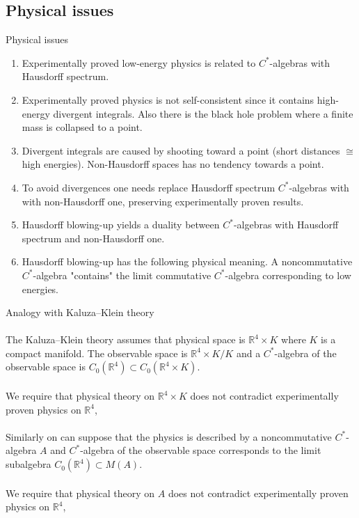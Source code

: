 \documentclass{beamer}
\theoremstyle{plain}
\newcommand{\Rb}{\mathbb{R}}
\begin{document}
\begin{frame}
\section{Physical issues}
\centering\huge{Physical issues} \normalsize
$~$\\
\begin{enumerate}
	\item 	Experimentally proved low-energy physics is related to $C^*$-algebras with Hausdorff spectrum.
	\item 		Experimentally proved physics is not self-consistent since it contains high-energy  divergent integrals. Also there is the \alert{black hole problem} where a finite mass is collapsed to a point.
	\item Divergent integrals are caused by shooting toward a point (short distances $\cong$ high energies). Non-Hausdorff spaces has no tendency towards a point.
	\item To avoid divergences one needs replace Hausdorff spectrum $C^*$-algebras with with non-Hausdorff one, \alert{preserving experimentally proven results}.
	\item Hausdorff blowing-up yields a duality between $C^*$-algebras with Hausdorff spectrum and non-Hausdorff one.
	\item Hausdorff blowing-up has the following physical meaning. A noncommutative $C^*$-algebra "contains" the \alert{limit} commutative $C^*$-algebra corresponding to low energies.
\end{enumerate}
\end{frame}
\begin{frame}
	\huge{Analogy with Kaluza–Klein theory} \normalsize
	$~$\\
	$~$\\
The Kaluza–Klein theory assumes that physical space  is $\Rb^4 \times K$ where $K$ is a compact manifold. The \alert{observable  space} is $\Rb^4 \times K/K$ and a $C^*$-algebra of the  \alert{observable  space}  is $C_0\left(\Rb^4 \right) \subset C_0\left(\Rb^4 \times K\right)$.
\\
$~$\\
We require that physical theory on $\Rb^4 \times K$ does not contradict experimentally proven physics on $\Rb^4$,
\\
$~$\\
Similarly on can suppose that the physics is described by a noncommutative $C^*$-algebra $A$ and  $C^*$-algebra of the  \alert{observable  space}  corresponds to the \alert{limit subalgebra} $C_0\left( \Rb^4\right) \subset M\left( A\right)$.
\\
$~$\\
We require that physical theory on $A$ does not contradict experimentally proven physics on $\Rb^4$,	
	\end{frame}
\end{document}
